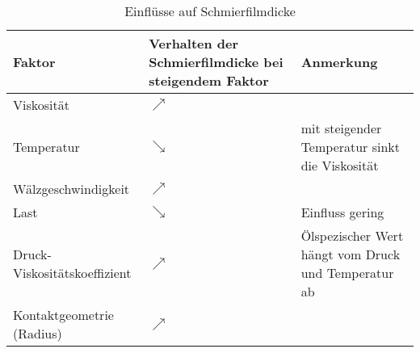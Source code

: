 \begin{table}[htbp]
    \caption{Einflüsse auf Schmierfilmdicke \cite{wisniewski_2000}}
    \begin{tabular}{l>{\centering\arraybackslash}m{5cm}>{\centering\arraybackslash}m{6cm}}
        \textbf{Faktor}              & \textbf{Verhalten der Schmierfilmdicke bei steigendem Faktor} & \textbf{Anmerkung}                             \\ \hline
        Viskosität                   & $\nearrow$                                                    &                                                \\
        Temperatur                   & $\searrow$                                                    & mit steigender Temperatur sinkt die Viskosität \\
        Wälzgeschwindigkeit          & $\nearrow$                                                    &                                                \\
        Last                         & $\searrow$                                                    & Einfluss gering                                \\
        Druck-Viskositätskoeffizient & $\nearrow$                                                    & Ölspezischer Wert hängt vom Druck und Temperatur ab           \\
        Kontaktgeometrie (Radius)    & $\nearrow$                                                    &                                                \\
    \end{tabular}
    \label{tab:faktor_einfluss_schmierfilmdicke}
\end{table}
